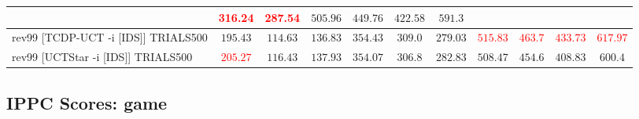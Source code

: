 \documentclass{article}
\begin{document}
\begin{tabular}{|l|r@{$\pm$}rr@{$\pm$}rr@{$\pm$}rr@{$\pm$}rr@{$\pm$}rr@{$\pm$}rr@{$\pm$}rr@{$\pm$}rr@{$\pm$}rr@{$\pm$}r|}
& \multicolumn{2}{c}{\textbf{\textcolor{red}{316.24}}}
& \multicolumn{2}{c}{\textbf{\textcolor{red}{287.54}}}
& \multicolumn{2}{c}{$505.96$}
& \multicolumn{2}{c}{$449.76$}
& \multicolumn{2}{c}{$422.58$}
& \multicolumn{2}{c|}{$591.3$}
\\
\hline
rev99 [TCDP-UCT -i [IDS]] TRIALS500
& \multicolumn{2}{c}{$195.43$}
& \multicolumn{2}{c}{$114.63$}
& \multicolumn{2}{c}{$136.83$}
& \multicolumn{2}{c}{$354.43$}
& \multicolumn{2}{c}{$309.0$}
& \multicolumn{2}{c}{$279.03$}
& \multicolumn{2}{c}{\textbf{\textcolor{red}{$515.83$}}}
& \multicolumn{2}{c}{\textbf{\textcolor{red}{$463.7$}}}
& \multicolumn{2}{c}{\textbf{\textcolor{red}{$433.73$}}}
& \multicolumn{2}{c|}{\textbf{\textcolor{red}{$617.97$}}}
\\
rev99 [UCTStar -i [IDS]] TRIALS500
& \multicolumn{2}{c}{\textbf{\textcolor{red}{$205.27$}}}
& \multicolumn{2}{c}{$116.43$}
& \multicolumn{2}{c}{$137.93$}
& \multicolumn{2}{c}{$354.07$}
& \multicolumn{2}{c}{$306.8$}
& \multicolumn{2}{c}{$282.83$}
& \multicolumn{2}{c}{\textbf{$508.47$}}
& \multicolumn{2}{c}{$454.6$}
& \multicolumn{2}{c}{$408.83$}
& \multicolumn{2}{c|}{\textbf{$600.4$}}
\\
\hline
\end{tabular}%

\bigskip

\subsection*{IPPC Scores: game}
\end{document}
